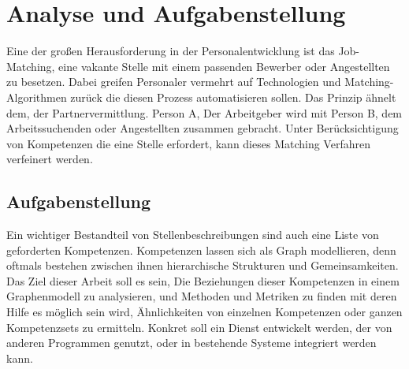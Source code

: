 \section{Analyse und Aufgabenstellung}\label{analysis}

%
%

Eine der großen Herausforderung in der Personalentwicklung ist das Job-Matching, eine vakante Stelle mit einem passenden Bewerber oder Angestellten zu besetzen. Dabei greifen Personaler vermehrt auf Technologien und Matching-Algorithmen zurück die diesen Prozess automatisieren sollen. Das Prinzip ähnelt dem, der Partnervermittlung. Person A, Der Arbeitgeber wird mit Person B, dem Arbeitssuchenden oder Angestellten zusammen gebracht. Unter Berücksichtigung von Kompetenzen die eine Stelle erfordert, kann dieses Matching Verfahren verfeinert werden.


\vspace{1em}

\subsection{Aufgabenstellung}

Ein wichtiger Bestandteil von Stellenbeschreibungen sind auch eine Liste von geforderten Kompetenzen. Kompetenzen lassen sich als Graph modellieren, denn oftmals bestehen zwischen ihnen hierarchische Strukturen und Gemeinsamkeiten. Das Ziel dieser Arbeit soll es sein, Die Beziehungen dieser Kompetenzen in einem Graphenmodell zu analysieren, und Methoden und Metriken zu finden mit deren Hilfe es möglich sein wird, Ähnlichkeiten von einzelnen Kompetenzen oder ganzen Kompetenzsets zu ermitteln. Konkret soll ein Dienst entwickelt werden, der von anderen Programmen genutzt, oder in bestehende Systeme integriert werden kann.

